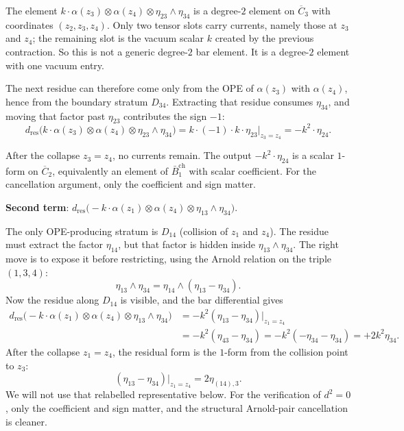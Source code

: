 The element $k \cdot \alpha(z_3) \otimes \alpha(z_4)
\otimes \eta_{23} \wedge \eta_{34}$ is a degree-$2$ element
on $\overline{C}_3$ with coordinates $(z_2, z_3, z_4)$.
Only two tensor slots carry currents, namely those at
$z_3$ and $z_4$; the remaining slot is the vacuum scalar
$k$ created by the previous contraction.  So this is not a
generic degree-$2$ bar element.  It is a degree-$2$ element with
one vacuum entry.

The next residue can therefore come only from the OPE of
$\alpha(z_3)$ with $\alpha(z_4)$, hence from the boundary stratum
$D_{34}$.  Extracting that residue consumes $\eta_{34}$, and moving
that factor past $\eta_{23}$ contributes the sign $-1$:
\begin{equation}\label{eq:frame-dsq-T1}
d_{\mathrm{res}}\bigl(
  k \cdot \alpha(z_3) \otimes \alpha(z_4)
  \otimes \eta_{23} \wedge \eta_{34}\bigr)
= k \cdot (-1) \cdot k \cdot \eta_{23}\big|_{z_3 = z_4}
= -k^2 \cdot \eta_{24}.
\end{equation}

After the collapse $z_3 = z_4$, no currents remain.
The output $-k^2 \cdot \eta_{24}$ is a scalar $1$-form on
$\overline{C}_2$, equivalently an element of
$\bar{B}_1^{\mathrm{ch}}$ with scalar coefficient.  For the
cancellation argument, only the coefficient and sign matter.

\medskip
\noindent\textbf{Second term}: $d_{\mathrm{res}}\bigl(
- k \cdot \alpha(z_1) \otimes \alpha(z_4)
\otimes \eta_{13} \wedge \eta_{34}\bigr)$.

The only OPE-producing stratum is $D_{14}$ (collision of $z_1$
and $z_4$).  The residue must extract the factor $\eta_{14}$, but that
factor is hidden inside $\eta_{13} \wedge \eta_{34}$.  The right move is
to expose it before restricting, using the Arnold relation on the
triple $(1,3,4)$:
\[
\eta_{13} \wedge \eta_{34}
= \eta_{14} \wedge (\eta_{13} - \eta_{34}).
\]
Now the residue along $D_{14}$ is visible, and the bar differential gives
\begin{equation}\label{eq:frame-dsq-T2}
\begin{aligned}
d_{\mathrm{res}}\bigl(
  -k \cdot \alpha(z_1) \otimes \alpha(z_4)
  \otimes \eta_{13} \wedge \eta_{34}\bigr)
&= -k^2 (\eta_{13} - \eta_{34})\big|_{z_1 = z_4} \\
&= -k^2 (\eta_{43} - \eta_{34})
= -k^2(-\eta_{34} - \eta_{34})
= +2k^2 \eta_{34}.
\end{aligned}
\end{equation}
After the collapse $z_1 = z_4$, the residual form is the $1$-form from
the collision point to $z_3$:
\[
(\eta_{13} - \eta_{34})\big|_{z_1 = z_4} = 2\eta_{(14),3}.
\]
We will not use that relabelled representative below.  For the
verification of $d^2 = 0$, only the coefficient and sign matter, and
the structural Arnold-pair cancellation is cleaner.

